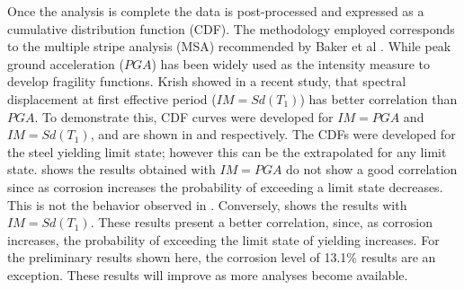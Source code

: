 Once the analysis is complete the data is post-processed and expressed as a cumulative distribution function (CDF). The methodology employed corresponds to the multiple stripe analysis (MSA) recommended by Baker et al \cite{Baker2015}. While peak ground acceleration ($PGA$) has been widely used as the intensity measure to develop fragility functions\cite{Ghosh2015}\cite{Bisadi2015}\cite{Shekhar2018}. Krish \cite{Krish2018} showed in a recent study, that spectral displacement at first effective period ($IM=Sd(T_1)$) has better correlation than $PGA$. To demonstrate this, CDF curves were developed for $IM=PGA$ and $IM=Sd(T_1)$, and are shown in  and  respectively. The CDFs were developed for the steel yielding limit state; however this can be the extrapolated for any limit state.  shows the results obtained with $IM=PGA$ do not show a good correlation since as corrosion increases the probability of exceeding a limit state decreases. This is not the behavior observed in . Conversely,  shows the results with $IM=Sd(T_1)$. These results present a better correlation, since, as corrosion increases, the probability of exceeding the limit state of yielding increases. For the preliminary results shown here, the corrosion level of 13.1\% results are an exception. These results will improve as more analyses become available. 


